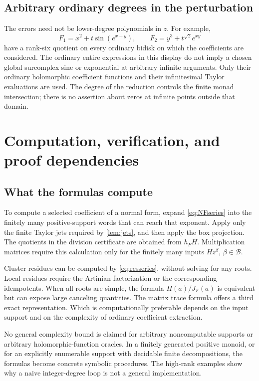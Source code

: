 \documentclass[11pt,letterpaper]{article}
\theoremstyle{definition}
\theoremstyle{remark}
\newcommand{\BB}{\mathcal B}
\numberwithin{equation}{section}
\begin{document}
\subsection{Arbitrary ordinary degrees in the perturbation}
The errors need not be lower-degree polynomials in $z$. For example,
\[
 F_1=x^2+t\sin(e^{x+y}),\qquad F_2=y^3+t^{\sqrt2}e^{xy}
\]
have a rank-six quotient on every ordinary bidisk on which the coefficients are considered. The ordinary entire expressions in this display do not imply a chosen global surcomplex sine or exponential at arbitrary infinite arguments. Only their ordinary holomorphic coefficient functions and their infinitesimal Taylor evaluations are used. The degree of the reduction controls the finite monad intersection; there is no assertion about zeros at infinite points outside that domain.

\section{Computation, verification, and proof dependencies}\label{sec:verification}
\subsection{What the formulas compute}
To compute a selected coefficient of a normal form, expand \eqref{eq:NFseries} into the finitely many positive-support words that can reach that exponent. Apply only the finite Taylor jets required by \cref{lem:jets}, and then apply the box projection. The quotients in the division certificate are obtained from $h_FH$. Multiplication matrices require this calculation only for the finitely many inputs $Hz^\beta$, $\beta\in\BB$.

Cluster residues can be computed by \eqref{eq:resseries}, without solving for any roots. Local residues require the Artinian factorization or the corresponding idempotents. When all roots are simple, the formula $H(a)/J_F(a)$ is equivalent but can expose large canceling quantities. The matrix trace formula offers a third exact representation. Which is computationally preferable depends on the input support and on the complexity of ordinary coefficient extraction.

No general complexity bound is claimed for arbitrary noncomputable supports or arbitrary holomorphic-function oracles. In a finitely generated positive monoid, or for an explicitly enumerable support with decidable finite decompositions, the formulas become concrete symbolic procedures. The high-rank examples show why a naive integer-degree loop is not a general implementation.
\end{document}
